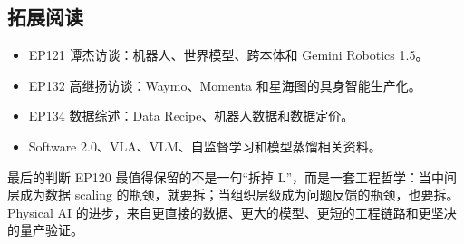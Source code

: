 \subsection{拓展阅读}

\begin{itemize}
\item EP121 谭杰访谈：机器人、世界模型、跨本体和 Gemini Robotics 1.5。
\item EP132 高继扬访谈：Waymo、Momenta 和星海图的具身智能生产化。
\item EP134 数据综述：Data Recipe、机器人数据和数据定价。
\item Software 2.0、VLA、VLM、自监督学习和模型蒸馏相关资料。
\end{itemize}

\begin{importantbox}{最后的判断}
EP120 最值得保留的不是一句“拆掉 L”，而是一套工程哲学：当中间层成为数据 scaling 的瓶颈，就要拆；当组织层级成为问题反馈的瓶颈，也要拆。Physical AI 的进步，来自更直接的数据、更大的模型、更短的工程链路和更坚决的量产验证。
\end{importantbox}


